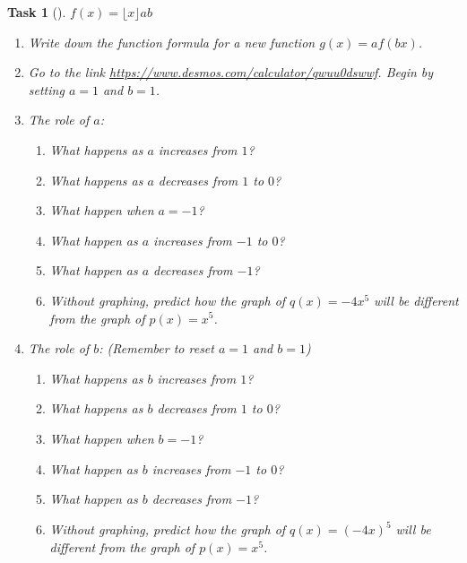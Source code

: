 \documentclass[10pt,]{article}
\theoremstyle{plain}
\newtheorem{proposition}[theorem]{Task}
\theoremstyle{definition}
\numberwithin{equation}{section}
\begin{document}
\begin{proposition}[{}]\label{proposition-41}
\(f(x)=\lfloor x \rfloor\)\(a\)\(b\)\leavevmode%
\begin{enumerate}
\item\hypertarget{li-204}{}Write down the function formula for a new function \(g(x) = af(bx)\).%
\item\hypertarget{li-205}{}Go to the link \href{https://www.desmos.com/calculator/qwuu0dswwf}{https://www.desmos.com/calculator/qwuu0dswwf}. Begin by setting \(a = 1\) and \(b = 1\).%
\item\hypertarget{li-206}{}\hypertarget{p-103}{}%
The role of \(a\): %
\begin{enumerate}
\item\hypertarget{li-207}{}What happens as \(a\) increases from \(1\)?%
\item\hypertarget{li-208}{}What happens as \(a\) decreases from \(1\) to \(0\)?%
\item\hypertarget{li-209}{}What happen when \(a = -1\)?%
\item\hypertarget{li-210}{}What happen as \(a\) increases from \(-1\) to \(0\)?%
\item\hypertarget{li-211}{}What happen as \(a\) decreases from \(-1\)?%
\item\hypertarget{li-212}{}Without graphing, predict how the graph of \(q(x)=-4x^5\) will be different from the graph of \(p(x)=x^5\).%
\end{enumerate}
%
\item\hypertarget{li-213}{}\hypertarget{p-104}{}%
The role of \(b\): (Remember to reset \(a=1\) and \(b=1\)) %
\begin{enumerate}
\item\hypertarget{li-214}{}What happens as \(b\) increases from \(1\)?%
\item\hypertarget{li-215}{}What happens as \(b\) decreases from \(1\) to \(0\)?%
\item\hypertarget{li-216}{}What happen when \(b = -1\)?%
\item\hypertarget{li-217}{}What happen as \(b\) increases from \(-1\) to \(0\)?%
\item\hypertarget{li-218}{}What happen as \(b\) decreases from \(-1\)?%
\item\hypertarget{li-219}{}Without graphing, predict how the graph of \(q(x)=(-4x)^5\) will be different from the graph of \(p(x)=x^5\).%
\end{enumerate}
%
\end{enumerate}
\end{proposition}
\end{document}
